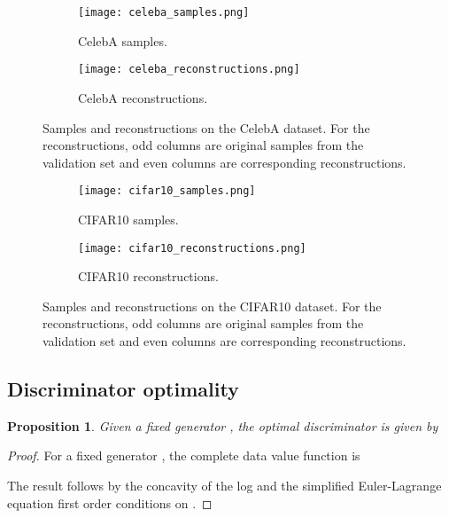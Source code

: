\documentclass{article}
\newtheorem{prop}{Proposition}
\newcommand{\figureHeight}{5cm}
\begin{document}
\begin{figure}[p]
    \centering
    \begin{subfigure}[t]{0.49\textwidth}
        \centering
        \texttt{[image: celeba\_samples.png]}
        \caption{\label{fig:celeba_samples} CelebA samples.}
    \end{subfigure}
    \hfill
    \begin{subfigure}[t]{0.49\textwidth}
        \centering
        \texttt{[image: celeba\_reconstructions.png]}
        \caption{\label{fig:celeba_reconstructions} CelebA reconstructions.}
    \end{subfigure}
    \caption{\label{fig:celeba_images} Samples and reconstructions on the CelebA
        dataset. For the reconstructions, odd columns are
        original samples from the validation set and even columns are
        corresponding reconstructions.}
\end{figure}

\begin{figure}[p]
    \centering
    \begin{subfigure}[t]{0.49\textwidth}
        \centering
        \texttt{[image: cifar10\_samples.png]}
        \caption{\label{fig:cifar10_samples} CIFAR10 samples.}
    \end{subfigure}
    \hfill
    \begin{subfigure}[t]{0.49\textwidth}
        \centering
        \texttt{[image: cifar10\_reconstructions.png]}
        \caption{\label{fig:cifar10_reconstructions} CIFAR10
          reconstructions.}
    \end{subfigure}
    \caption{\label{fig:cifar10_images} Samples and reconstructions on the
        CIFAR10 dataset. For the reconstructions, odd columns are
        original samples from the validation set and even columns are
        corresponding reconstructions.}
\end{figure}

\subsection{Discriminator optimality}
\label{sec:disc_opt}
\begin{prop}
    Given a fixed generator , the optimal discriminator is given by
    
\end{prop}
\begin{proof}
	For a fixed generator , the complete data value function is
	
	The result follows by the concavity of the log and the simplified
	Euler-Lagrange equation first order conditions on
	.
\end{proof}
\end{document}
